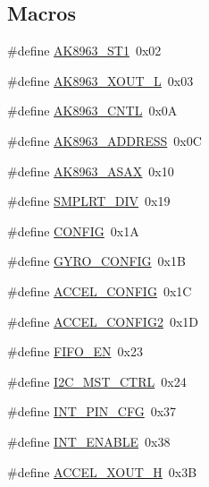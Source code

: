 \subsection*{Macros}
\begin{DoxyCompactItemize}
\item 
\#define \hyperlink{i2c-interface_8c_a0037cda572379e26ecad5030c64aaf10}{A\+K8963\+\_\+\+S\+T1}~0x02
\item 
\#define \hyperlink{i2c-interface_8c_a35260c212eacc1f2808af33bdc55c8fa}{A\+K8963\+\_\+\+X\+O\+U\+T\+\_\+L}~0x03
\item 
\#define \hyperlink{i2c-interface_8c_a9049064347064927059f71ea3843f986}{A\+K8963\+\_\+\+C\+N\+TL}~0x0A
\item 
\#define \hyperlink{i2c-interface_8c_a1ec3de258ab1151da16b56ebb4cfd83d}{A\+K8963\+\_\+\+A\+D\+D\+R\+E\+SS}~0x0C
\item 
\#define \hyperlink{i2c-interface_8c_a66032b6572950d4fb7044420a6beeee2}{A\+K8963\+\_\+\+A\+S\+AX}~0x10
\item 
\#define \hyperlink{i2c-interface_8c_a7119c37e38b6736096ea1565459043ba}{S\+M\+P\+L\+R\+T\+\_\+\+D\+IV}~0x19
\item 
\#define \hyperlink{i2c-interface_8c_a76ea3cf49247a07c54b3db005a3c7f57}{C\+O\+N\+F\+IG}~0x1A
\item 
\#define \hyperlink{i2c-interface_8c_ac57e8c3192c859321b447c07089f20f0}{G\+Y\+R\+O\+\_\+\+C\+O\+N\+F\+IG}~0x1B
\item 
\#define \hyperlink{i2c-interface_8c_ab7336e26f8947086e41a375f1e1e74d4}{A\+C\+C\+E\+L\+\_\+\+C\+O\+N\+F\+IG}~0x1C
\item 
\#define \hyperlink{i2c-interface_8c_aecbf5cd71bd0e677bf19d2e855323794}{A\+C\+C\+E\+L\+\_\+\+C\+O\+N\+F\+I\+G2}~0x1D
\item 
\#define \hyperlink{i2c-interface_8c_a53954ec7f9dc790f00548da08ccd5ed6}{F\+I\+F\+O\+\_\+\+EN}~0x23
\item 
\#define \hyperlink{i2c-interface_8c_a24bc05247067ad9f0479f5a6d49c6412}{I2\+C\+\_\+\+M\+S\+T\+\_\+\+C\+T\+RL}~0x24
\item 
\#define \hyperlink{i2c-interface_8c_ab00fdfba66092d2d869031629c092dad}{I\+N\+T\+\_\+\+P\+I\+N\+\_\+\+C\+FG}~0x37
\item 
\#define \hyperlink{i2c-interface_8c_abf7a56466fd6203663685a04448c9185}{I\+N\+T\+\_\+\+E\+N\+A\+B\+LE}~0x38
\item 
\#define \hyperlink{i2c-interface_8c_a94b93aa4aabbe7caec7884ddb46b531b}{A\+C\+C\+E\+L\+\_\+\+X\+O\+U\+T\+\_\+H}~0x3B
\item 

\end{DoxyCompactItemize}
